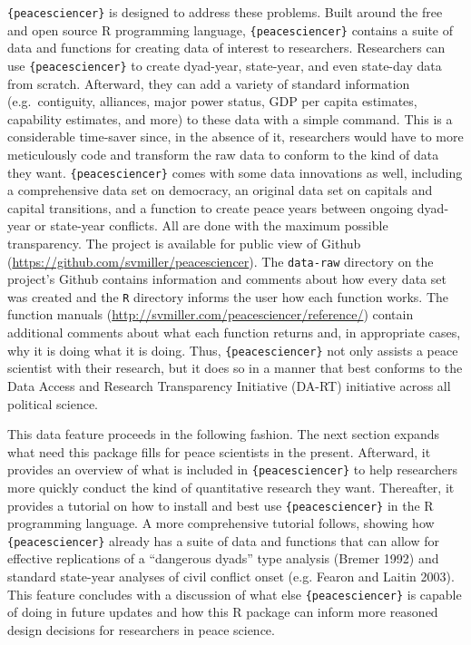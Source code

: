 \documentclass[
  11pt,
]{article}
\begin{document}
\texttt{\{peacesciencer\}} is designed to address these problems. Built around the free and open source R programming language, \texttt{\{peacesciencer\}} contains a suite of data and functions for creating data of interest to researchers. Researchers can use \texttt{\{peacesciencer\}} to create dyad-year, state-year, and even state-day data from scratch. Afterward, they can add a variety of standard information (e.g.~contiguity, alliances, major power status, GDP per capita estimates, capability estimates, and more) to these data with a simple command. This is a considerable time-saver since, in the absence of it, researchers would have to more meticulously code and transform the raw data to conform to the kind of data they want. \texttt{\{peacesciencer\}} comes with some data innovations as well, including a comprehensive data set on democracy, an original data set on capitals and capital transitions, and a function to create peace years between ongoing dyad-year or state-year conflicts. All are done with the maximum possible transparency. The project is available for public view of Github (\url{https://github.com/svmiller/peacesciencer}). The \texttt{data-raw} directory on the project's Github contains information and comments about how every data set was created and the \texttt{R} directory informs the user how each function works. The function manuals (\url{http://svmiller.com/peacesciencer/reference/}) contain additional comments about what each function returns and, in appropriate cases, why it is doing what it is doing. Thus, \texttt{\{peacesciencer\}} not only assists a peace scientist with their research, but it does so in a manner that best conforms to the Data Access and Research Transparency Initiative (DA-RT) initiative across all political science.

This data feature proceeds in the following fashion. The next section expands what need this package fills for peace scientists in the present. Afterward, it provides an overview of what is included in \texttt{\{peacesciencer\}} to help researchers more quickly conduct the kind of quantitative research they want. Thereafter, it provides a tutorial on how to install and best use \texttt{\{peacesciencer\}} in the R programming language. A more comprehensive tutorial follows, showing how \texttt{\{peacesciencer\}} already has a suite of data and functions that can allow for effective replications of a ``dangerous dyads'' type analysis (Bremer 1992) and standard state-year analyses of civil conflict onset (e.g. Fearon and Laitin 2003). This feature concludes with a discussion of what else \texttt{\{peacesciencer\}} is capable of doing in future updates and how this R package can inform more reasoned design decisions for researchers in peace science.
\end{document}
